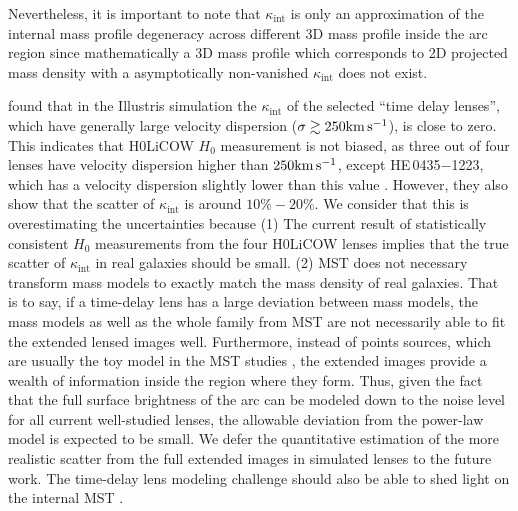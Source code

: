 \documentclass[useAMS,usenatbib]{mnras}
\newcommand\he{HE\,0435$-$1223}
\def\kms {\rm km\,s^{-1}}
\begin{document}
Nevertheless, it is important to note that $\kappa_{\textrm{int}}$ is only an approximation of the internal mass profile degeneracy across different 3D mass profile inside the arc region since mathematically a 3D mass profile which corresponds to 2D projected mass density with a asymptotically non-vanished $\kappa_{\textrm{int}}$ does not exist.

\citet{XuEtal16} found that in the Illustris simulation the $\kappa_{\textrm{int}}$ of the selected ``time delay lenses'', which have generally large velocity dispersion ($\sigma \gtrsim 250\kms$), is close to zero. 
This indicates that H0LiCOW $H_{0}$ measurement is not biased, as three out of four lenses have velocity dispersion higher than $250\kms$, except \he, which has a velocity dispersion slightly lower than this value \citep{SuyuEtal10,SuyuEtal13,AgnelloEtal15_2,WongEtal17}. 
However, they also show that the scatter of $\kappa_{\textrm{int}}$ is around $10\%-20\%$. 
We consider that this is overestimating the uncertainties because (1) The current result of statistically consistent $H_{0}$ measurements from the four H0LiCOW lenses \citep{BirrerEtal18} implies that the true scatter of $\kappa_{\textrm{int}}$ in real galaxies should be small.
(2) MST does not necessary transform mass models to exactly match the mass density of real galaxies. 
That is to say, if a time-delay lens has a large deviation between mass models, the mass models as well as the whole family from MST are not necessarily able to fit the extended lensed images well. 
Furthermore, instead of points sources, which are usually the toy model in the MST studies \citep[e.g., ][]{SchneiderSluse13,XuEtal16}, the extended images provide a wealth of information inside the region where they form. 
Thus, given the fact that the full surface brightness of the arc can be modeled down to the noise level for all current well-studied lenses, the allowable deviation from the power-law model is expected to be small. 
We defer the quantitative estimation of the more realistic scatter from the full extended images in simulated lenses to the future work. The time-delay lens modeling challenge should also be able to shed light on the internal MST \citep{DingEtal18}.
\end{document}
